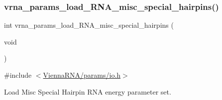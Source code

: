\subsubsection{\texorpdfstring{vrna\_params\_load\_RNA\_misc\_special\_hairpins()}{vrna\_params\_load\_RNA\_misc\_special\_hairpins()}}
{\footnotesize\ttfamily int vrna\+\_\+params\+\_\+load\+\_\+\+R\+N\+A\+\_\+misc\+\_\+special\+\_\+hairpins (\begin{DoxyParamCaption}\item[{void}]{ }\end{DoxyParamCaption})}



{\ttfamily \#include $<$\mbox{\hyperlink{io_8h}{Vienna\+R\+N\+A/params/io.\+h}}$>$}



Load Misc Special Hairpin R\+NA energy parameter set. 

